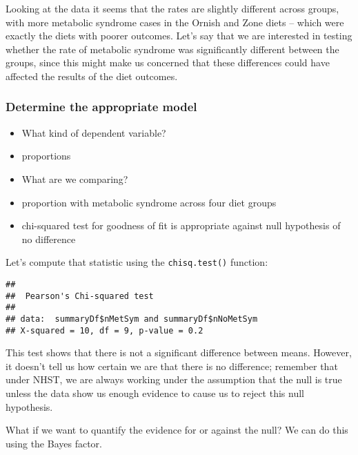 \documentclass[]{book}
\newenvironment{Shaded}{\begin{snugshade}}{\end{snugshade}}
\newcommand{\KeywordTok}[1]{\textcolor[rgb]{0.13,0.29,0.53}{\textbf{#1}}}
\newcommand{\OperatorTok}[1]{\textcolor[rgb]{0.81,0.36,0.00}{\textbf{#1}}}
\newcommand{\NormalTok}[1]{#1}
\providecommand{\tightlist}{%
  \setlength{\itemsep}{0pt}\setlength{\parskip}{0pt}}
\theoremstyle{definition}
\theoremstyle{definition}
\theoremstyle{definition}
\theoremstyle{remark}
\begin{document}
Looking at the data it seems that the rates are slightly different
across groups, with more metabolic syndrome cases in the Ornish and Zone
diets -- which were exactly the diets with poorer outcomes. Let's say
that we are interested in testing whether the rate of metabolic syndrome
was significantly different between the groups, since this might make us
concerned that these differences could have affected the results of the
diet outcomes.

\subsubsection{Determine the appropriate
model}\label{determine-the-appropriate-model-1}

\begin{itemize}
\tightlist
\item
  What kind of dependent variable?
\item
  proportions
\item
  What are we comparing?
\item
  proportion with metabolic syndrome across four diet groups
\item
  chi-squared test for goodness of fit is appropriate against null
  hypothesis of no difference
\end{itemize}

Let's compute that statistic using the \texttt{chisq.test()} function:

\begin{Shaded}
\end{Shaded}

\begin{verbatim}
## 
##  Pearson's Chi-squared test
## 
## data:  summaryDf$nMetSym and summaryDf$nNoMetSym
## X-squared = 10, df = 9, p-value = 0.2
\end{verbatim}

This test shows that there is not a significant difference between
means. However, it doesn't tell us how certain we are that there is no
difference; remember that under NHST, we are always working under the
assumption that the null is true unless the data show us enough evidence
to cause us to reject this null hypothesis.

What if we want to quantify the evidence for or against the null? We can
do this using the Bayes factor.
\end{document}
